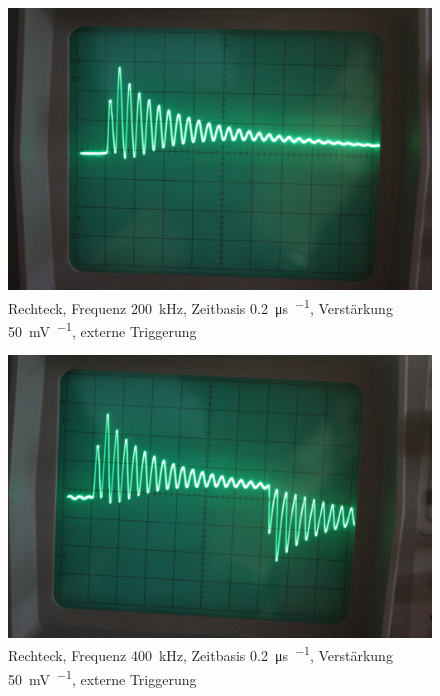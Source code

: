 \begin{figure}
	\centering
	\begin{minipage}{.45\linewidth}
	\end{minipage}
	\hfill
	\begin{minipage}{.45\linewidth}
	\includegraphics[width=\linewidth]{Fotos/IMG_0769-1500.jpg}
	\end{minipage}
	\caption{%
		Rechteck, Frequenz \SI{200}{\kilo\hertz},
		Zeitbasis \SI{.2}{\micro\second\per\division},
		Verstärkung \SI{50}{\milli\volt\per\division},
		externe Triggerung
	}
	\label{fig:0769}
\end{figure}

\begin{figure}
	\centering
	\begin{minipage}{.45\linewidth}
	\end{minipage}
	\hfill
	\begin{minipage}{.45\linewidth}
	\includegraphics[width=\linewidth]{Fotos/IMG_0770-1500.jpg}
	\end{minipage}
	\caption{%
		Rechteck, Frequenz \SI{400}{\kilo\hertz},
		Zeitbasis \SI{.2}{\micro\second\per\division},
		Verstärkung \SI{50}{\milli\volt\per\division},
		externe Triggerung
	}
	\label{fig:0770}
\end{figure}

